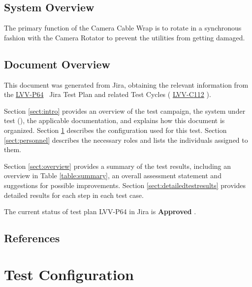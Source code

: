\documentclass[SE,lsstdraft,STR,toc]{lsstdoc}
\begin{document}
\subsection{System Overview}
\label{sect:systemoverview}

 The primary function of the Camera Cable Wrap is to rotate in a
synchronous fashion with the Camera Rotator to prevent the utilities
from getting damaged.


\subsection{Document Overview}
\label{sect:docoverview}

This document was generated from Jira, obtaining the relevant information from the 
\href{https://jira.lsstcorp.org/secure/Tests.jspa#/testPlan/LVV-P64}{LVV-P64}
~Jira Test Plan and related Test Cycles (
  \href{https://jira.lsstcorp.org/secure/Tests.jspa#/testCycle/LVV-C112}{LVV-C112}
).

Section \ref{sect:intro} provides an overview of the test campaign, the system under test (\product{}), the applicable documentation, and explains how this document is organized.
Section \ref{sect:configuration}  describes the configuration used for this test.
Section \ref{sect:personnel} describes the necessary roles and lists the individuals assigned to them.

Section \ref{sect:overview} provides a summary of the test results, including an overview in Table \ref{table:summary}, an overall assessment statement and suggestions for possible improvements.
Section \ref{sect:detailedtestresults} provides detailed results for each step in each test case.

The current status of test plan LVV-P64 in Jira is \textbf{ Approved }.

\subsection{References}
\label{sect:references}
\renewcommand{\refname}{}

\section{Test Configuration}
\label{sect:configuration}
\end{document}
